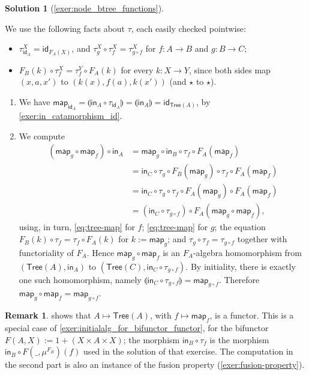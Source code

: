 \documentclass[a4paper,11pt, oneside,titlepage=false]{scrbook}
\theoremstyle{plain}
\theoremstyle{definition}
\newtheorem{rem}[thm]{Remark}
\newtheorem{solution}[thm]{Solution}
\newcommand{\cfont}[1]{\ensuremath{\mathsf{#1}}}
\newcommand{\Id}[1][]{\cfont{id}_{#1}}
\newcommand{\Initalg}[1]{\ensuremath{\mu^{#1}}}
\newcommand{\catam}[1]{\llparenthesis #1 \rrparenthesis}
\newcommand{\In}{\ensuremath{\mathsf{in}}}
\begin{document}
\begin{solution}[\cref{exer:node_btree_functions}]
\begin{enumerate}
    We use the following facts about $\tau$, each easily checked pointwise:
    \begin{itemize}
    \item $\tau^X_{\Id[A]} = \Id[F_A(X)]$, and $\tau^X_g \circ \tau^X_f = \tau^X_{g \circ f}$ for $f : A \to B$ and $g : B \to C$;
    \item $F_B(k) \circ \tau^X_f = \tau^Y_f \circ F_A(k)$ for every $k : X \to Y$, since both sides map $(x, a, x')$ to $(k(x), f(a), k(x'))$ (and $\star$ to $\star$).
    \end{itemize}
    \begin{enumerate}
    \item We have $\mathsf{map}_{\Id[A]} = \catam{\In_A \circ \tau_{\Id[A]}} = \catam{\In_A} = \Id[\mathsf{Tree}(A)]$, by \cref{exer:in_catamorphism_id}.
    \item We compute
      \begin{align*}
        (\mathsf{map}_g \circ \mathsf{map}_f) \circ \In_A
        &= \mathsf{map}_g \circ \In_B \circ \tau_f \circ F_A(\mathsf{map}_f) \\
        &= \In_C \circ \tau_g \circ F_B(\mathsf{map}_g) \circ \tau_f \circ F_A(\mathsf{map}_f) \\
        &= \In_C \circ \tau_g \circ \tau_f \circ F_A(\mathsf{map}_g) \circ F_A(\mathsf{map}_f) \\
        &= (\In_C \circ \tau_{g \circ f}) \circ F_A(\mathsf{map}_g \circ \mathsf{map}_f),
      \end{align*}
      using, in turn, \eqref{eq:tree-map} for $f$; \eqref{eq:tree-map} for $g$;
      the equation $F_B(k) \circ \tau_f = \tau_f \circ F_A(k)$ for $k := \mathsf{map}_g$;
      and $\tau_g \circ \tau_f = \tau_{g \circ f}$ together with functoriality of $F_A$.
      Hence $\mathsf{map}_g \circ \mathsf{map}_f$ is an $F_A$-algebra homomorphism from $(\mathsf{Tree}(A), \In_A)$ to $(\mathsf{Tree}(C), \In_C \circ \tau_{g \circ f})$.
      By initiality, there is exactly one such homomorphism, namely $\catam{\In_C \circ \tau_{g \circ f}} = \mathsf{map}_{g \circ f}$.
      Therefore $\mathsf{map}_g \circ \mathsf{map}_f = \mathsf{map}_{g \circ f}$.
    \end{enumerate}
  \end{enumerate}

  \begin{rem}
     shows that $A \mapsto \mathsf{Tree}(A)$, with $f \mapsto \mathsf{map}_f$, is a functor.
    This is a special case of \cref{exer:initialalg_for_bifunctor_functor}, for the bifunctor $F(A, X) := 1 + (X \times A \times X)$;
    the morphism $\In_B \circ \tau_f$ is the morphism $\In_B \circ F(\_, \Initalg{F_B})(f)$ used in the solution of that exercise.
    The computation in the second part is also an instance of the fusion property (\cref{exer:fusion-property}).
  \end{rem}
\end{solution}
\end{document}
